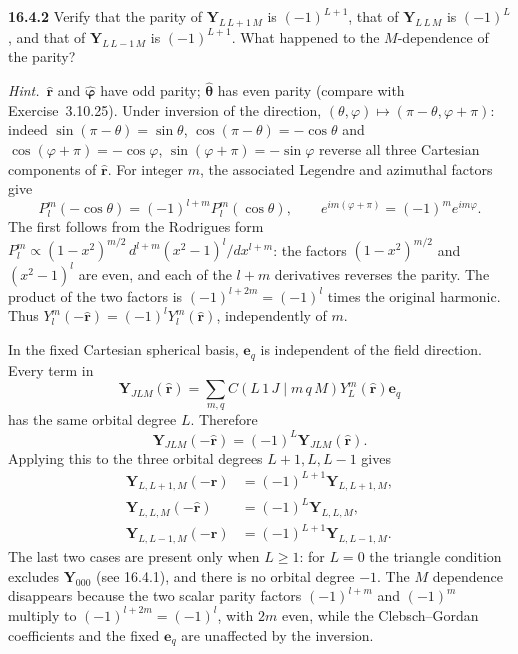 \par\bigskip
\noindent\textbf{16.4.2}\quad {} Verify that the parity of
$\mathbf{Y}_{L\,L+1\,M}$ is $(-1)^{L+1}$, that of
$\mathbf{Y}_{L\,L\,M}$ is $(-1)^{L}$, and that of
$\mathbf{Y}_{L\,L-1\,M}$ is $(-1)^{L+1}$. What happened to the
$M$-dependence of the parity?
\par\emph{Hint.}~$\hat{\mathbf{r}}$ and $\hat{\boldsymbol{\varphi}}$
have odd parity; $\hat{\boldsymbol{\theta}}$ has even parity (compare
with Exercise~3.10.25).
\solution
Under inversion of the direction,
$(\theta,\varphi)\mapsto(\pi-\theta,\varphi+\pi)$: indeed
$\sin(\pi-\theta)=\sin\theta$, $\cos(\pi-\theta)=-\cos\theta$ and
$\cos(\varphi+\pi)=-\cos\varphi$, $\sin(\varphi+\pi)=-\sin\varphi$
reverse all three Cartesian components of $\hat{\mathbf r}$.
For integer $m$, the associated Legendre and azimuthal factors give
\[
P_l^m(-\cos\theta)=(-1)^{l+m}P_l^m(\cos\theta),\qquad
e^{im(\varphi+\pi)}=(-1)^m e^{im\varphi}.
\]
The first follows from the Rodrigues form
$P_l^m\propto(1-x^2)^{m/2}\,d^{l+m}(x^2-1)^l/dx^{l+m}$: the factors
$(1-x^2)^{m/2}$ and $(x^2-1)^l$ are even, and each of the $l+m$
derivatives reverses the parity.
The product of the two factors is $(-1)^{l+2m}=(-1)^l$ times the
original harmonic.
Thus $Y_l^m(-\hat{\mathbf r})=(-1)^lY_l^m(\hat{\mathbf r})$,
independently of $m$.

In the fixed Cartesian spherical basis, $\mathbf e_q$ is independent
of the field direction. Every term in
\[
\mathbf Y_{JLM}(\hat{\mathbf r})
=\sum_{m,q}C(L\,1\,J\mid m\,q\,M)Y_L^m(\hat{\mathbf r})\mathbf e_q
\]
has the same orbital degree $L$. Therefore
\[
\mathbf Y_{JLM}(-\hat{\mathbf r})=(-1)^L
\mathbf Y_{JLM}(\hat{\mathbf r}).
\]
Applying this to the three orbital degrees $L+1,L,L-1$ gives
\[
\boxed{\begin{aligned}
\mathbf Y_{L,L+1,M}(-\hat{\mathbf r})&=(-1)^{L+1}\mathbf Y_{L,L+1,M},\\
\mathbf Y_{L,L,M}(-\hat{\mathbf r})&=(-1)^L\mathbf Y_{L,L,M},\\
\mathbf Y_{L,L-1,M}(-\hat{\mathbf r})&=(-1)^{L+1}\mathbf Y_{L,L-1,M}.
\end{aligned}}
\]
The last two cases are present only when $L\ge1$: for $L=0$ the
triangle condition excludes $\mathbf Y_{000}$ (see 16.4.1), and there
is no orbital degree $-1$.
The $M$ dependence disappears because the two scalar parity factors
$(-1)^{l+m}$ and $(-1)^m$ multiply to $(-1)^{l+2m}=(-1)^l$, with $2m$
even, while the Clebsch--Gordan coefficients and the fixed
$\mathbf e_q$ are unaffected by the inversion.

